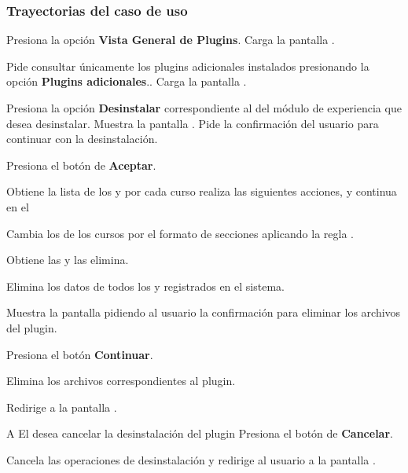 \subsubsection{Trayectorias del caso de uso}

\begin{UCtrayectoria}%
%
  \Actor Presiona la opción {\bf Vista General de Plugins}.
  \Sistema Carga la pantalla .

  \Actor Pide consultar únicamente los plugins adicionales instalados presionando
         la opción {\bf Plugins adicionales}..
  \Sistema Carga la pantalla .

  \Actor Presiona la opción {\bf Desinstalar} correspondiente al
          del módulo de experiencia que desea desinstalar.
  \Sistema Muestra la pantalla .
  \Sistema Pide la confirmación del usuario para continuar con la desinstalación.

  \Actor Presiona el botón de {\bf Aceptar}. 

  \Sistema Obtiene la lista de los  y por cada curso
           realiza las siguientes acciones, y continua en el \label{CU-E03-loop-delete-course}

  \Sistema Cambia los  de los cursos por el formato de 
           secciones aplicando la regla .

  \Sistema Obtiene las  
           y las elimina.

  \Sistema Elimina los datos de todos los  y 
            registrados en el sistema.

  \Sistema Muestra la pantalla  pidiendo al usuario la confirmación
           para eliminar los archivos del plugin.

  \Actor Presiona el botón {\bf Continuar}. 


  \Sistema Elimina los archivos correspondientes al plugin.

  \Sistema Redirige a la pantalla .

\end{UCtrayectoria}

\begin{UCtrayectoriaA}{A}{%
El  desea cancelar la desinstalación del plugin
}
  \Actor Presiona el botón de {\bf Cancelar}.

  \Sistema Cancela las operaciones de desinstalación y redirige al usuario a la 
           pantalla .
\end{UCtrayectoriaA}

